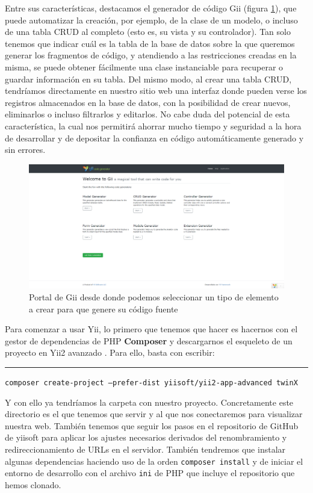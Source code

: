 Entre sus características, destacamos el generador de código Gii (figura \ref{fig:gii}), que puede automatizar la creación, por ejemplo, de la clase de un modelo, o incluso de una tabla CRUD al completo (esto es, su vista y su controlador). Tan solo tenemos que indicar cuál es la tabla de la base de datos sobre la que queremos generar los fragmentos de código, y atendiendo a las restricciones creadas en la misma, se puede obtener fácilmente una clase instanciable para recuperar o guardar información en su tabla. Del mismo modo, al crear una tabla CRUD, tendríamos directamente en nuestro sitio web una interfaz donde pueden verse los registros almacenados en la base de datos, con la posibilidad de crear nuevos, eliminarlos o incluso filtrarlos y editarlos. No cabe duda del potencial de esta característica, la cual nos permitirá ahorrar mucho tiempo y seguridad a la hora de desarrollar y de depositar la confianza en código automáticamente generado y sin errores.

\begin{figure}
	\centering
	\includegraphics[width=\textwidth]{gii}
	\caption[Portal de Gii]{Portal de Gii desde donde podemos seleccionar un tipo de elemento a crear para que genere su código fuente}
	\label{fig:gii}
\end{figure}


Para comenzar a usar Yii, lo primero que tenemos que hacer es hacernos con el gestor de dependencias de PHP \textbf{Composer} \cite{composer} y descargarnos el esqueleto de un proyecto en Yii2 avanzado \cite{yii2advanced}. Para ello, basta con escribir:

\par\noindent\rule{\textwidth}{0.4pt}
\texttt{composer create-project --prefer-dist yiisoft/yii2-app-advanced twinX}
\smallskip

Y con ello ya tendríamos la carpeta con nuestro proyecto. Concretamente este directorio es el que tenemos que servir y al que nos conectaremos para visualizar nuestra web. También tenemos que seguir los pasos en el repositorio de GitHub de yiisoft para aplicar los ajustes necesarios derivados del renombramiento y redireccionamiento de URLs en el servidor. También tendremos que instalar algunas dependencias haciendo uso de la orden \texttt{composer install} y de iniciar el entorno de desarrollo con el archivo \texttt{ini} de PHP que incluye el repositorio que hemos clonado.

